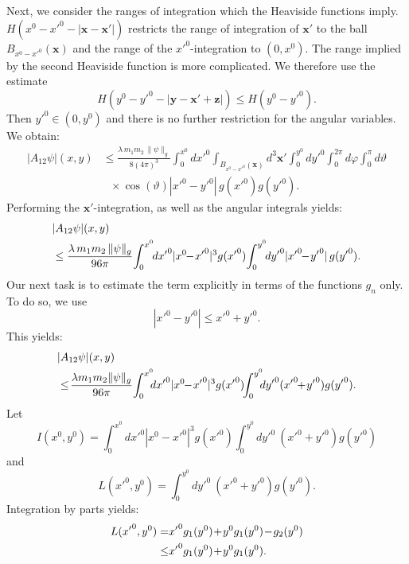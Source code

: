 \documentclass[b5paper,draft,openbib,12pt]{memoir}
\newcommand{\vx}{\mathbf{x}}
\newcommand{\vy}{\mathbf{y}}
\newcommand{\vz}{\mathbf{z}}
\begin{document}
Next, we consider the ranges of integration which the Heaviside 
functions imply. $H(x^0-{x'}^0-|\vx-\vx'|)$ restricts the range 
of integration of $\vx'$ to the ball $B_{x^0-{x'}^0}(\vx)$ and the 
range of the ${x'}^0$-integration to $(0,x^0)$. The range implied 
by the second Heaviside function is more complicated. We therefore 
use the estimate
\begin{equation}
	H(y^0-{y'}^0-|\vy-\vx'+\vz|) \leq H(y^0-{y'}^0).
\end{equation}
Then ${y'}^0 \in (0,y^0)$ and there is no further restriction for 
the angular variables. We obtain:
\begin{align}
|A_{12} \psi|(x,y) &\leq \frac{\lambda \, m_1 m_2 \, \| \psi \|_g}{8(4\pi)^3}  \int_0^{x^0} d{x'}^0 \int_{B_{x^0-{x'}^0}(\vx)} \!\!\!\!\!\!\!\!\!\! d^3 \vx' \int_0^{y^0} d{y'}^0 \int_0^{2\pi} d\varphi \int_{0}^{\pi} d \vartheta \nonumber\\
&~~~\times \cos(\vartheta) |{x'}^0-{y'}^0| \, g({x'}^0)g({y'}^0).
\end{align}
Performing the $\vx'$-integration, as well as the angular integrals 
yields:
\begin{align}
  &|A_{12} \psi|(x,y) \notag\\
  &\leq \frac{\lambda \, m_1 m_2 \, \| \psi \|_g}{96\pi}\!  \int_0^{x^0}\!\! d{x'}^0 |x^0\!\!-\!{x'}^0|^3 g({x'}^0)\! \int_0^{y^0}\!\! d{y'}^0 |{x'}^0\!\!-\!{y'}^0| \, g({y'}^0).
\end{align}
Our next task is to estimate the term explicitly in terms of the 
functions $g_n$ only. To do so, we use
\begin{equation}
	|{x'}^0-{y'}^0| \leq {x'}^0 + {y'}^0.
\end{equation}
This yields:
\begin{align}
  &|A_{12} \psi|(x,y) \notag\\
  &\leq \!\frac{\lambda  m_1 m_2  \| \psi \|_g}{96\pi}\!  \int_0^{x^0} \!\!\!d{x'}^0 |x^0\!\!-\!{x'}^0|^3 g({x'}^0) \!\!\int_0^{y^0} \!\!\!d{y'}^0 ({x'}^0 \!\!+\! {y'}^0) g({y'}^0).
\label{eq:a12estimatecalc}
\end{align}
Let
\begin{equation}
	I(x^0,y^0) = \int_0^{x^0} d{x'}^0 |x^0-{x'}^0|^3 g({x'}^0) \int_0^{y^0} d{y'}^0~ ({x'}^0 + {y'}^0) g({y'}^0)
\end{equation}
and
\begin{equation}
	L({x'}^0,y^0) = \int_0^{y^0} d{y'}^0~ ({x'}^0 + {y'}^0) g({y'}^0).
\end{equation}
Integration by parts yields:
\begin{align}
  L({x'}^0,y^0) =& {x'}^0 g_1(y^0) \!+\! y^0 g_1(y^0) \!-\! g_2(y^0) \notag\\
  \leq& {x'}^0 g_1(y^0) \!+\! y^0 g_1(y^0).
\end{align}
\end{document}
